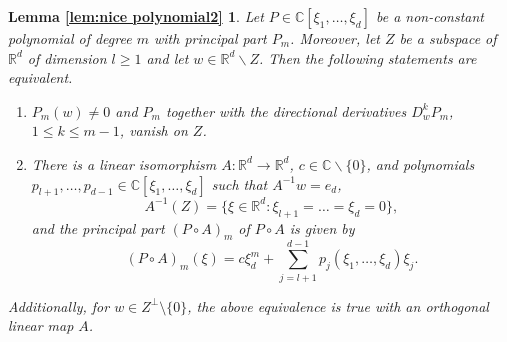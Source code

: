 \documentclass[a4paper,10pt]{amsart}
\newtheorem*{crucial lemma}{Lemma \ref{lem:nice polynomial2}}
\theoremstyle{definition}
\newcommand{\R}{\mathbb{R}}
\newcommand{\C}{\mathbb{C}}
\begin{document}
\begin{crucial lemma}
	Let $P\in\C[\xi_1,\ldots,\xi_d]$ be a non-constant polynomial of degree $m$ with principal part $P_m$. Moreover, let $Z$ be a subspace of $\R^d$ of dimension $l\geq 1$ and let $w\in \R^d\backslash Z$. Then the following statements are equivalent.
    \begin{enumerate}
        \item[\upshape{(i)}] 
	    $P_m(w)\neq0$ and $P_m$ together with the directional derivatives $D^k_w P_m$, $1\leq k\leq m-1$, vanish on $Z$. 
	   \item[\upshape{(ii)}] There is a linear isomorphism $A:\R^d\rightarrow\R^d$,  $c\in\C\backslash\{0\}$, and polynomials $p_{l+1},\ldots,p_{d-1}\in\C[\xi_1,\ldots,\xi_d]$ such that $A^{-1}w=e_d$,
	\[A^{-1}(Z)=\{\xi\in\R^d\colon \xi_{l+1}=\ldots=\xi_d=0\},\]
    and the principal part $(P\circ A)_m$ of $P\circ A$ is given by
	\[(P\circ A)_m(\xi)=c\xi_d^m + \sum_{j=l+1}^{d-1}p_j(\xi_1,\ldots,\xi_d)\xi_j.\] 
    \end{enumerate}
    Additionally, for $w\in Z^\perp\setminus\{0\}$, the above equivalence is true with an orthogonal linear map $A$.
\end{crucial lemma}
\end{document}
